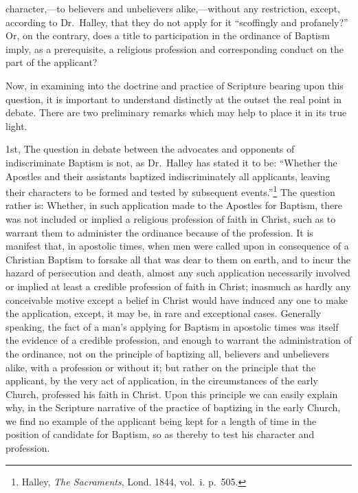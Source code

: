 \documentclass[]{book}
\begin{document}
character,---to believers and unbelievers alike,---without any restriction, except, according to Dr.~Halley, that they do not apply for it ``scoffingly and profanely?'' Or, on the contrary, does a title to participation in the ordinance of Baptism imply, as a prerequisite, a religious profession and corresponding conduct on the part of the applicant?

Now, in examining into the doctrine and practice of Scripture bearing upon this question, it is important to understand distinctly at the outset the real point in debate. There are two preliminary remarks which may help to place it in its true light.

1st, The question in debate between the advocates and opponents of indiscriminate Baptism is not, as Dr.~Halley has stated it to be: ``Whether the Apostles and their assistants baptized indiscriminately all applicants, leaving their characters to be formed and tested by subsequent events.''\footnote{Halley, \emph{The Sacraments}, Lond. 1844, vol.~i. p.~505.} The question rather is: Whether, in such application made to the Apostles for Baptism, there was not included or implied a religious profession of faith in Christ, such as to warrant them to administer the ordinance because of the profession. It is manifest that, in apostolic times, when men were called upon in consequence of a Christian Baptism to forsake all that was dear to them on earth, and to incur the hazard of persecution and death, almost any such application necessarily involved or implied at least a credible profession of faith in Christ; inasmuch as hardly any conceivable motive except a belief in Christ would have induced any one to make the application, except, it may be, in rare and exceptional cases. Generally speaking, the fact of a man's applying for Baptism in apostolic times was itself the evidence of a credible profession, and enough to warrant the administration of the ordinance, not on the principle of baptizing all, believers and unbelievers alike, with a profession or without it; but rather on the principle that the applicant, by the very act of application, in the circumstances of the early Church, professed his faith in Christ. Upon this principle we can easily explain why, in the Scripture narrative of the practice of baptizing in the early Church, we find no example of the applicant being kept for a length of time in the position of candidate for Baptism, so as thereby to test his character and profession.
\end{document}
